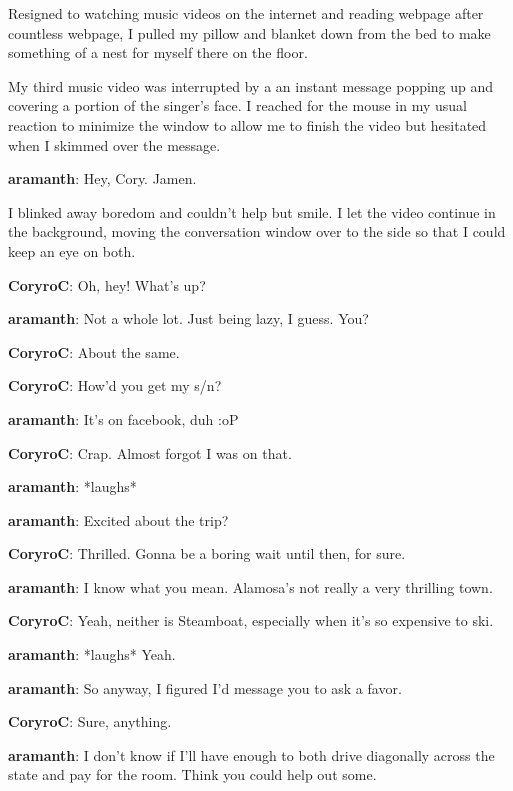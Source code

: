 Resigned to watching music videos on the internet and reading webpage after countless webpage, I pulled my pillow and blanket down from the bed to make something of a nest for myself there on the floor.

My third music video was interrupted by a an instant message popping up and covering a portion of the singer's face.  I reached for the mouse in my usual reaction to minimize the window to allow me to finish the video but hesitated when I skimmed over the message.

\vspace{1em}\textbf{\color{red}aramanth}: Hey, Cory.  Jamen.\vspace{1em}

I blinked away boredom and couldn't help but smile.  I let the video continue in the background, moving the conversation window over to the side so that I could keep an eye on both.\vspace{1em}

\textbf{\color{blue}CoryroC}: Oh, hey!  What's up?

\textbf{\color{red}aramanth}: Not a whole lot.  Just being lazy, I guess.  You?

\textbf{\color{blue}CoryroC}: About the same.

\textbf{\color{blue}CoryroC}: How'd you get my s/n?

\textbf{\color{red}aramanth}: It's on facebook, duh :oP

\textbf{\color{blue}CoryroC}: Crap.  Almost forgot I was on that.

\textbf{\color{red}aramanth}: *laughs*

\textbf{\color{red}aramanth}: Excited about the trip?

\textbf{\color{blue}CoryroC}: Thrilled.  Gonna be a boring wait until then, for sure.

\textbf{\color{red}aramanth}: I know what you mean.  Alamosa's not really a very thrilling town.

\textbf{\color{blue}CoryroC}: Yeah, neither is Steamboat, especially when it's so expensive to ski.

\textbf{\color{red}aramanth}: *laughs* Yeah.

\textbf{\color{red}aramanth}: So anyway, I figured I'd message you to ask a favor.

\textbf{\color{blue}CoryroC}: Sure, anything.

\textbf{\color{red}aramanth}: I don't know if I'll have enough to both drive diagonally across the state and pay for the room.  Think you could help out some.

